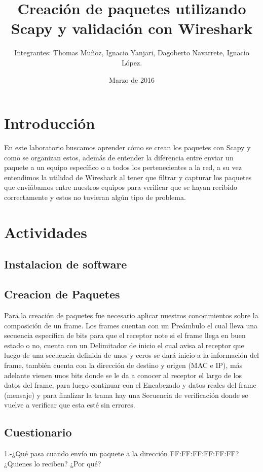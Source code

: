 \documentclass{udpreport}
\title{Creación de paquetes utilizando Scapy y validación con Wireshark}
\author{Integrantes: Thomas Muñoz, Ignacio Yanjari, Dagoberto Navarrete, Ignacio López.}
\date{Marzo de 2016}
\begin{document}
\maketitle
\tableofcontents
\chapter{Introducción}
	En este laboratorio buscamos aprender cómo se crean los paquetes con Scapy y como se organizan estos, además de entender la
	diferencia entre enviar un paquete a un equipo específico o a todos los pertenecientes a la red, a su vez entendimos la
	utilidad de Wireshark al tener que filtrar y capturar los paquetes que enviábamos entre nuestros equipos para verificar que se
	hayan recibido correctamente y estos no tuvieran algún tipo de problema.
\chapter{Actividades}
	\section{Instalacion de software}

	\section{Creacion de Paquetes}
		Para la creación de paquetes fue necesario aplicar nuestros conocimientos sobre la composición de un frame.
		Los frames cuentan con un Preámbulo el cual lleva una secuencia específica de bits para que el receptor note si el frame llega en buen estado o no, cuenta con un Delimitador de inicio el cual avisa al receptor que luego de una secuencia definida de unos y ceros se dará inicio a la información del frame, también cuenta con la dirección de destino y origen (MAC e IP), más adelante vienen unos bits donde se le da a conocer al receptor el largo de los datos del frame, para luego continuar con el Encabezado y datos reales del frame (mensaje) y para finalizar la trama hay una Secuencia de verificación donde se vuelve a verificar que esta esté sin errores.\\
	\section{Cuestionario}
	
	  1.-¿Qué pasa cuando envío un paquete a la dirección FF:FF:FF:FF:FF:FF? ¿Quienes
	     lo reciben? ¿Por qué?\\
	  
\end{document}
